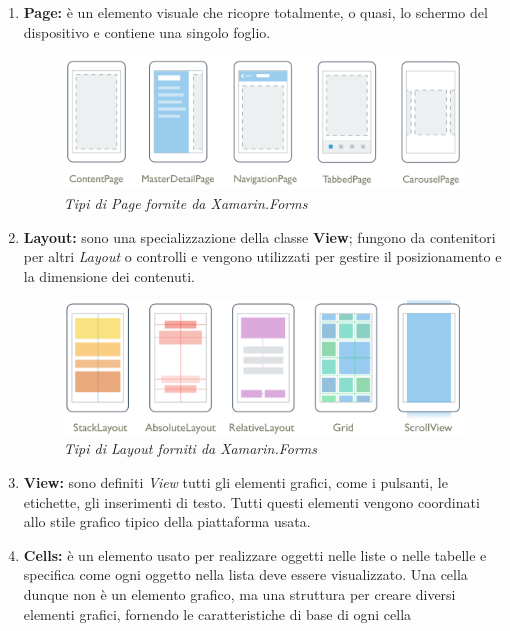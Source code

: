 \begin{enumerate}
	\item \textbf{Page:} è un elemento visuale che ricopre totalmente, o quasi, lo schermo del dispositivo e contiene una singolo foglio.
	
	\begin{figure}[ht]
		\centering
		\includegraphics[scale=0.30]{immagini/progettazione/page-types.png}
		\caption{\textit{Tipi di Page fornite da Xamarin.Forms}}
	\end{figure}\FloatBarrier
	
	\item \textbf{Layout:} sono una specializzazione della classe \textbf{View}; fungono da contenitori per altri \textit{Layout} o controlli e vengono utilizzati per gestire il posizionamento e la dimensione dei contenuti.
	
		\begin{figure}[ht]
			\centering
			\includegraphics[scale=0.33]{immagini/progettazione/Layouts.png}
			\caption{\textit{Tipi di Layout forniti da Xamarin.Forms}}
		\end{figure}\FloatBarrier
		
		\item \textbf{View:} sono definiti \textit{View} tutti gli elementi grafici, come i pulsanti, le etichette, gli inserimenti di testo. Tutti questi elementi vengono coordinati allo stile grafico tipico della piattaforma usata.
		
		\item \textbf{Cells:} è un elemento usato per realizzare oggetti nelle liste o nelle tabelle e specifica come ogni oggetto nella lista deve essere visualizzato. Una cella dunque non è un elemento grafico, ma una struttura per creare diversi elementi grafici, fornendo le caratteristiche di base di ogni cella
		
\end{enumerate}

